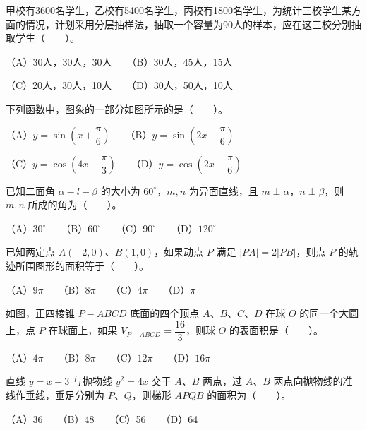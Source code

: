 \begin{question}
甲校有3600名学生，乙校有5400名学生，丙校有1800名学生，为统计三校学生某方面的情况，计划采用分层抽样法，抽取一个容量为90人的样本，应在这三校分别抽取学生\mbox{（　　）}。

（A）30人，30人，30人　　（B）30人，45人，15人

（C）20人，30人，10人　　（D）30人，50人，10人

\Needspace{0.4\textheight}
\end{question}
\begin{question}
下列函数中，图象的一部分如图所示的是\mbox{（　　）}。
\nopagebreak[4]
\begin{center}\end{center}
\nopagebreak[4]
（A）$y=\sin\left(x+\dfrac\pi6\right)$　　（B）$y=\sin\left(2x-\dfrac\pi6\right)$

（C）$y=\cos\left(4x-\dfrac\pi3\right)$　　（D）$y=\cos\left(2x-\dfrac\pi6\right)$

\end{question}
\begin{question}
已知二面角 $\alpha-l-\beta$ 的大小为 $60^\circ$，$m,n$ 为异面直线，且 $m\perp\alpha$，$n\perp\beta$，则 $m,n$ 所成的角为\mbox{（　　）}。

（A）$30^\circ$　　（B）$60^\circ$　　（C）$90^\circ$　　（D）$120^\circ$

\end{question}
\begin{question}
已知两定点 $A(-2,0)$、$B(1,0)$，如果动点 $P$ 满足 $|PA|=2|PB|$，则点 $P$ 的轨迹所围图形的面积等于\mbox{（　　）}。

（A）$9\pi$　　（B）$8\pi$　　（C）$4\pi$　　（D）$\pi$

\Needspace{0.4\textheight}
\end{question}
\begin{question}
如图，正四棱锥 $P-ABCD$ 底面的四个顶点 $A\text{、}B\text{、}C\text{、}D$ 在球 $O$ 的同一个大圆上，点 $P$ 在球面上，如果 $V_{P-ABCD}=\dfrac{16}{3}$，则球 $O$ 的表面积是\mbox{（　　）}。
\nopagebreak[4]
\begin{center}\end{center}
\nopagebreak[4]
（A）$4\pi$　　（B）$8\pi$　　（C）$12\pi$　　（D）$16\pi$

\end{question}
\begin{question}
直线 $y=x-3$ 与抛物线 $y^2=4x$ 交于 $A\text{、}B$ 两点，过 $A\text{、}B$ 两点向抛物线的准线作垂线，垂足分别为 $P\text{、}Q$，则梯形 $APQB$ 的面积为\mbox{（　　）}。

（A）36　　（B）48　　（C）56　　（D）64

\end{question}
